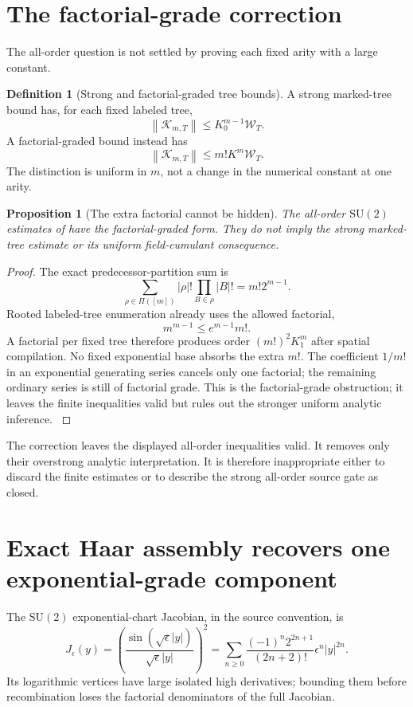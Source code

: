 \documentclass[11pt,oneside,openany]{book}
\newtheorem{proposition}[proposition]{Proposition}
\theoremstyle{definition}
\newtheorem{definition}[definition]{Definition}
\theoremstyle{remark}
\newcommand{\SU}{\mathrm{SU}}
\newcommand{\norm}[1]{\left\lVert#1\right\rVert}
\newcommand{\src}[2]{\cite[#2]{#1}}
\begin{document}
\section{The factorial-grade correction}
The all-order question is not settled by proving each fixed arity with a large constant.

\begin{definition}[Strong and factorial-graded tree bounds]\label{def:factorial}
A strong marked-tree bound has, for each fixed labeled tree,
\[
\norm{\mathcal K_{m,T}}\le K_0^{m-1}\mathcal W_T.
\]
A factorial-graded bound instead has
\[
\norm{\mathcal K_{m,T}}\le m!K^m\mathcal W_T.
\]
The distinction is uniform in $m$, not a change in the numerical constant at one arity.
\end{definition}

\begin{proposition}[The extra factorial cannot be hidden]\label{prop:factorial}
The all-order $\SU(2)$ estimates of \src{F5}{V1--V11} have the factorial-graded form. They do not imply the strong marked-tree estimate or its uniform field-cumulant consequence.
\end{proposition}
\begin{proof}
The exact predecessor-partition sum is
\begin{equation}\label{eq:partition-factorial}
\sum_{\rho\in\Pi([m])}|\rho|!\prod_{B\in\rho}|B|!
=m!2^{m-1}.
\end{equation}
Rooted labeled-tree enumeration already uses the allowed factorial,
\[
m^{m-1}\le e^{m-1}m!.
\]
A factorial per fixed tree therefore produces order $(m!)^2K_1^m$ after spatial compilation. No fixed exponential base absorbs the extra $m!$. The coefficient $1/m!$ in an exponential generating series cancels only one factorial; the remaining ordinary series is still of factorial grade. This is the factorial-grade obstruction; it leaves the finite inequalities valid but rules out the stronger uniform analytic inference. \src{F5}{V12}
\end{proof}

The correction leaves the displayed all-order inequalities valid. It removes only their overstrong analytic interpretation. It is therefore inappropriate either to discard the finite estimates or to describe the strong all-order source gate as closed.

\section{Exact Haar assembly recovers one exponential-grade component}
The $\SU(2)$ exponential-chart Jacobian, in the source convention, is
\begin{equation}\label{eq:Haar-series}
J_\epsilon(y)=\left(\frac{\sin(\sqrt\epsilon|y|)}{\sqrt\epsilon|y|}\right)^2
=\sum_{n\ge0}\frac{(-1)^n2^{2n+1}}{(2n+2)!}\epsilon^n|y|^{2n}.
\end{equation}
Its logarithmic vertices have large isolated high derivatives; bounding them before recombination loses the factorial denominators of the full Jacobian.
\end{document}
